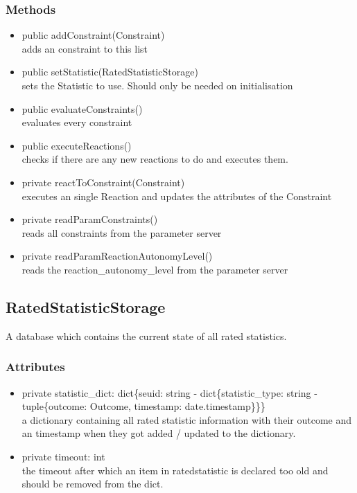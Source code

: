 \subsubsection{Methods}
\begin{itemize}
	\item public addConstraint(Constraint) \\
		adds an constraint to this list
	\item public setStatistic(RatedStatisticStorage) \\
		sets the Statistic to use. Should only be needed on initialisation
	\item public evaluateConstraints() \\
		evaluates every constraint
	\item public executeReactions() \\
		checks if there are any new reactions to do and executes them.
	\item private reactToConstraint(Constraint) \\
		executes an single Reaction and updates the attributes of the Constraint
	\item private readParamConstraints() \\
		reads all constraints from the parameter server
	\item private readParamReactionAutonomyLevel() \\
		reads the reaction\_autonomy\_level from the parameter server
\end{itemize}


\subsection{RatedStatisticStorage}
A database which contains the current state of all rated statistics.
\subsubsection{Attributes}
\begin{itemize}
	\item private statistic\_dict: dict\{seuid: string - dict\{statistic\_type: string - tuple\{outcome: Outcome, timestamp: date.timestamp\}\}\} \\
		a dictionary containing all rated statistic information with their outcome and an timestamp when they got added / updated to the dictionary.
	\item private timeout: int\\
		the timeout after which an item in ratedstatistic is declared too old and should be removed from the dict.
\end{itemize}

